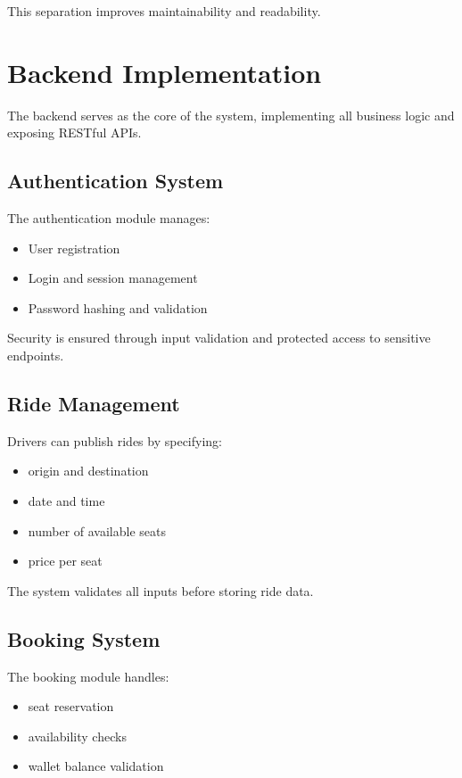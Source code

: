 This separation improves maintainability and readability.

\section{Backend Implementation}

The backend serves as the core of the system, implementing all business logic and exposing RESTful APIs.

\subsection{Authentication System}

The authentication module manages:
\begin{itemize}[noitemsep]
    \item User registration
    \item Login and session management
    \item Password hashing and validation
\end{itemize}

Security is ensured through input validation and protected access to sensitive endpoints.

\subsection{Ride Management}

Drivers can publish rides by specifying:
\begin{itemize}[noitemsep]
    \item origin and destination
    \item date and time
    \item number of available seats
    \item price per seat
\end{itemize}

The system validates all inputs before storing ride data.

\subsection{Booking System}

The booking module handles:
\begin{itemize}[noitemsep]
    \item seat reservation
    \item availability checks
    \item wallet balance validation
\end{itemize}

